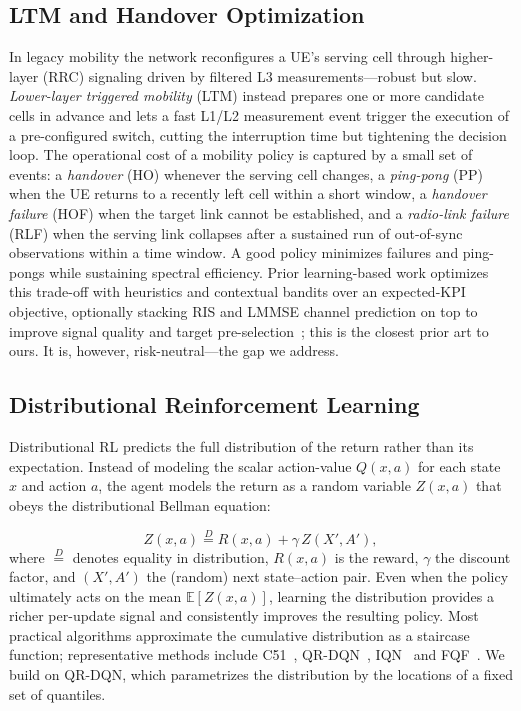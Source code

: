 \documentclass[conference]{IEEEtran}
\begin{document}
\subsection{LTM and Handover Optimization}
In legacy mobility the network reconfigures a UE's serving cell through
higher-layer (RRC) signaling driven by filtered L3 measurements---robust but slow.
\emph{Lower-layer triggered mobility} (LTM) instead prepares one or more candidate cells in advance and lets a fast L1/L2 measurement event trigger the execution of a pre-configured switch, cutting the interruption time but tightening the decision loop.
The operational cost of a mobility policy is captured by a small set of events: a \emph{handover} (HO) whenever the serving cell changes, a \emph{ping-pong} (PP) when the UE returns to a recently left cell within a short window, a \emph{handover failure} (HOF) when the target
link cannot be established, and a \emph{radio-link failure} (RLF) when the serving link collapses after a sustained run of out-of-sync observations within a time window.
A good policy minimizes failures and ping-pongs while sustaining spectral efficiency.
Prior learning-based work optimizes this trade-off with heuristics and contextual bandits over an expected-KPI objective, optionally stacking RIS and LMMSE channel prediction on top to improve signal quality and target pre-selection~\cite{cmab_ho}; this is the closest prior art to ours.
It is, however, risk-neutral---the gap we address.


\subsection{Distributional Reinforcement Learning}
\label{sec:rel-distrl}
Distributional RL predicts the full distribution of the return rather than its expectation. Instead of modeling the scalar action-value $Q(x,a)$ for each state $x$ and action $a$, the agent models the return as a random variable $Z(x,a)$ that obeys the distributional Bellman equation:

\begin{equation}
Z(x,a) \overset{D}{=} R(x,a) + \gamma\,Z(X',A'),
\label{eq:dist-bellman}
\end{equation}
where $\overset{D}{=}$ denotes equality in distribution, $R(x,a)$ is the reward, $\gamma$ the discount factor, and $(X',A')$ the (random) next state--action pair.
Even when the policy ultimately acts on the mean $\mathbb{E}[Z(x,a)]$, learning the distribution provides a richer per-update signal and consistently improves the resulting policy.
Most practical algorithms approximate the cumulative distribution as a staircase function; representative methods include C51~\cite{c51}, QR-DQN~\cite{qrdqn}, IQN~\cite{iqn} and FQF~\cite{fqf}.
We build on QR-DQN, which parametrizes the distribution by the locations of a fixed set of quantiles.
\end{document}
